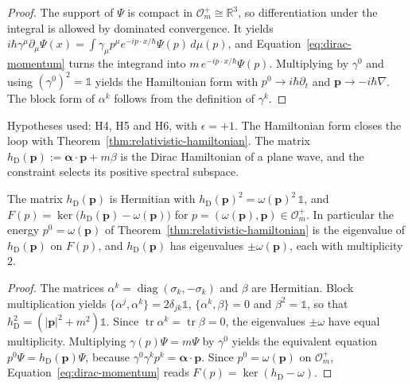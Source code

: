 \begin{proof}
	The support of $\Psi$ is compact in $\mathcal{O}_m^+\cong\mathbb{R}^3$, so differentiation under the integral is allowed by dominated convergence. It yields $i\hbar\gamma^\mu\partial_\mu\Psi(x)=\int\gamma_\mu p^\mu e^{-ip\cdot x/\hbar}\Psi(p)\,d\mu(p)$, and Equation~\eqref{eq:dirac-momentum} turns the integrand into $m\,e^{-ip\cdot x/\hbar}\Psi(p)$. Multiplying by $\gamma^0$ and using $(\gamma^0)^2=\mathbb{1}$ yields the Hamiltonian form with $p^0\to i\hbar\partial_t$ and $\mathbf{p}\to-i\hbar\nabla$. The block form of $\alpha^k$ follows from the definition of $\gamma^k$.
\end{proof}

\noindent Hypotheses used: H4, H5 and H6, with $\epsilon=+1$. The Hamiltonian form closes the loop with Theorem~\ref{thm:relativistic-hamiltonian}. The matrix $h_{\mathrm{D}}(\mathbf{p}):=\boldsymbol{\alpha}\cdot\mathbf{p}+m\beta$ is the Dirac Hamiltonian of a plane wave, and the constraint selects its positive spectral subspace.

\begin{proposition}\label{prop:dirac-hamiltonian}
	The matrix $h_{\mathrm{D}}(\mathbf{p})$ is Hermitian with $h_{\mathrm{D}}(\mathbf{p})^2=\omega(\mathbf{p})^2\,\mathbb{1}$, and $F(p)=\ker\big(h_{\mathrm{D}}(\mathbf{p})-\omega(\mathbf{p})\big)$ for $p=(\omega(\mathbf{p}),\mathbf{p})\in\mathcal{O}_m^+$. In particular the energy $p^0=\omega(\mathbf{p})$ of Theorem~\ref{thm:relativistic-hamiltonian} is the eigenvalue of $h_{\mathrm{D}}(\mathbf{p})$ on $F(p)$, and $h_{\mathrm{D}}(\mathbf{p})$ has eigenvalues $\pm\omega(\mathbf{p})$, each with multiplicity $2$.
\end{proposition}

\begin{proof}
	The matrices $\alpha^k=\operatorname{diag}(\sigma_k,-\sigma_k)$ and $\beta$ are Hermitian. Block multiplication yields $\{\alpha^j,\alpha^k\}=2\delta_{jk}\mathbb{1}$, $\{\alpha^k,\beta\}=0$ and $\beta^2=\mathbb{1}$, so that $h_{\mathrm{D}}^2=(|\mathbf{p}|^2+m^2)\mathbb{1}$. Since $\operatorname{tr}\alpha^k=\operatorname{tr}\beta=0$, the eigenvalues $\pm\omega$ have equal multiplicity. Multiplying $\gamma(p)\Psi=m\Psi$ by $\gamma^0$ yields the equivalent equation $p^0\Psi=h_{\mathrm{D}}(\mathbf{p})\Psi$, because $\gamma^0\gamma^kp^k=\boldsymbol{\alpha}\cdot\mathbf{p}$. Since $p^0=\omega(\mathbf{p})$ on $\mathcal{O}_m^+$, Equation~\eqref{eq:dirac-momentum} reads $F(p)=\ker(h_{\mathrm{D}}-\omega)$.
\end{proof}

